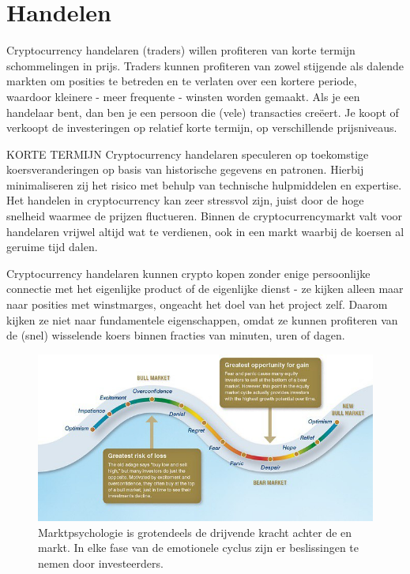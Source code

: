 \section{Handelen}
Cryptocurrency handelaren (traders) willen profiteren van korte termijn schommelingen in prijs. Traders kunnen profiteren van zowel stijgende als dalende markten om posities te betreden en te verlaten over een kortere periode, waardoor kleinere - meer frequente - winsten worden gemaakt. Als je een handelaar bent, dan ben je een persoon die (vele) transacties cre\"eert. Je koopt of verkoopt de investeringen op relatief korte termijn, op verschillende prijsniveaus.

   \medskip
    \begin{cryptobox}{KORTE TERMIJN}
       Cryptocurrency handelaren speculeren op toekomstige koersveranderingen op basis van historische gegevens en patronen. Hierbij minimaliseren zij het risico met behulp van technische hulpmiddelen en expertise. Het handelen in cryptocurrency kan zeer stressvol zijn, juist door de hoge snelheid waarmee de prijzen fluctueren. Binnen de cryptocurrencymarkt valt voor handelaren vrijwel altijd wat te verdienen, ook in een markt waarbij de koersen al geruime tijd dalen.
    \end{cryptobox}
    \medskip

Cryptocurrency handelaren kunnen crypto kopen zonder enige persoonlijke connectie met het eigenlijke product of de eigenlijke dienst - ze kijken alleen maar naar posities met winstmarges, ongeacht het doel van het project zelf. Daarom kijken ze niet naar fundamentele eigenschappen, omdat ze kunnen profiteren van de (snel) wisselende koers binnen fracties van minuten, uren of dagen. 

\begin{figure}
    \centering
    \includegraphics[width=.95\textwidth]{img/ch-investing/bear_bullmarket.jpg}
    \caption[Bear and bull markets and market psychology]{Marktpsychologie is grotendeels de drijvende kracht achter de   en  markt. In elke fase van de emotionele cyclus zijn er beslissingen te nemen door investeerders.}
    \label{fig:bear_bullmarket}
\end{figure}
    
